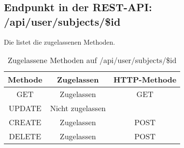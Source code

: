 \subsection{Endpunkt in der REST-API: /api/user/subjects/\$id}
Die  listet die zugelassenen Methoden. 

\begin{table}[!htbp]
	\begin{tabular}{|c|c|c|}
		\hline
			\textbf{Methode} & \textbf{Zugelassen} & \textbf{HTTP-Methode} \\ \hline
			GET & Zugelassen & GET \\ \hline
			UPDATE & Nicht zugelassen & \\ \hline 
			CREATE & Zugelassen & POST \\ \hline 
			DELETE & Zugelassen & POST \\ \hline
	\end{tabular}

		\caption{Zugelassene Methoden auf /api/user/subjects/\$id}
		\label{tab:end:rest:api:user:subjects:id:meth}
\end{table}